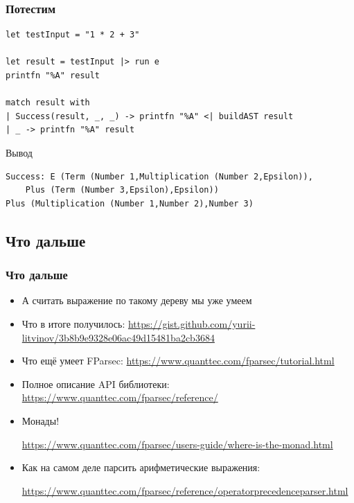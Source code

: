 \documentclass[xetex,mathserif,serif]{beamer}
\begin{document}
    \begin{frame}[fragile]
        \frametitle{Потестим}
        \begin{verbatim}
let testInput = "1 * 2 + 3"

let result = testInput |> run e
printfn "%A" result

match result with
| Success(result, _, _) -> printfn "%A" <| buildAST result
| _ -> printfn "%A" result
        \end{verbatim}

        \begin{exampleblock}{Вывод}
            \begin{verbatim}
Success: E (Term (Number 1,Multiplication (Number 2,Epsilon)),
    Plus (Term (Number 3,Epsilon),Epsilon))
Plus (Multiplication (Number 1,Number 2),Number 3)
            \end{verbatim}
        \end{exampleblock}
    \end{frame}

    \subsection{Что дальше}

    \begin{frame}
        \frametitle{Что дальше}
        \begin{small}
            \begin{itemize}
                \item А считать выражение по такому дереву мы уже умеем
                \item Что в итоге получилось: \url{https://gist.github.com/yurii-litvinov/3b8b9e9328e06ac49d15481ba2cb3684}
                \item Что ещё умеет FParsec: \url{https://www.quanttec.com/fparsec/tutorial.html}
                \item Полное описание API библиотеки: \url{https://www.quanttec.com/fparsec/reference/}
                \item Монады! 
                
                \url{https://www.quanttec.com/fparsec/users-guide/where-is-the-monad.html}
                \item Как на самом деле парсить арифметические выражения: 
                
                \url{https://www.quanttec.com/fparsec/reference/operatorprecedenceparser.html}
            \end{itemize}
        \end{small}
    \end{frame}
\end{document}
